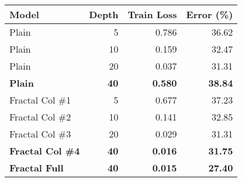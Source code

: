 \begin{tabular}{@{}lrrr@{}}
Model                    & Depth          & Train Loss     & Error (\%)     \\
\toprule
Plain                    & 5              & 0.786          & 36.62          \\
Plain                    & 10             & 0.159          & 32.47          \\
Plain                    & 20             & 0.037          & 31.31          \\
\textbf{Plain}           & \textbf{40}    & \textbf{0.580} & \textbf{38.84} \\
\midrule
Fractal Col \#1          & 5              & 0.677          & 37.23          \\
Fractal Col \#2          & 10             & 0.141          & 32.85          \\
Fractal Col \#3          & 20             & 0.029          & 31.31          \\
\textbf{Fractal Col \#4} & \textbf{40}    & \textbf{0.016} & \textbf{31.75} \\
\midrule
\textbf{Fractal Full}    & \textbf{40}    & \textbf{0.015} & \textbf{27.40} \\
\bottomrule
\end{tabular}
%
%
%
